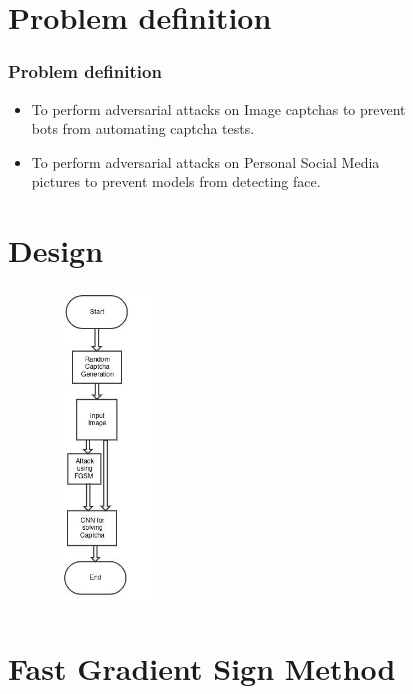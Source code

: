 \documentclass[t,10pt,pdftex]{beamer}
\begin{document}
\section{Problem definition}
\begin{frame}
	\frametitle{Problem definition}
	\begin{itemize}
		\item To perform adversarial attacks on Image captchas to prevent\\bots from automating captcha tests.
        \item To perform adversarial attacks on Personal Social Media\\pictures to prevent models from detecting face.
        
	\end{itemize}
\end{frame}
\section{Design}

\begin{frame}
	\frametitle{}
	\begin{figure}
	    \includegraphics[width=1.25in,height=3.25in]{uml.jpg}
	\end{figure}
\end{frame}


\section{Fast Gradient Sign Method}
\end{document}
